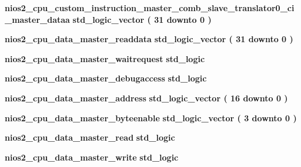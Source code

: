 \begin{DoxyCompactItemize}
\item 
{\bf nios2\+\_\+cpu\+\_\+custom\+\_\+instruction\+\_\+master\+\_\+comb\+\_\+slave\+\_\+translator0\+\_\+ci\+\_\+master\+\_\+dataa} {\bfseries \textcolor{comment}{std\+\_\+logic\+\_\+vector}\textcolor{vhdlchar}{ }\textcolor{vhdlchar}{(}\textcolor{vhdlchar}{ }\textcolor{vhdlchar}{ } \textcolor{vhdldigit}{31} \textcolor{vhdlchar}{ }\textcolor{keywordflow}{downto}\textcolor{vhdlchar}{ }\textcolor{vhdlchar}{ } \textcolor{vhdldigit}{0} \textcolor{vhdlchar}{ }\textcolor{vhdlchar}{)}\textcolor{vhdlchar}{ }} 
\item 
{\bf nios2\+\_\+cpu\+\_\+data\+\_\+master\+\_\+readdata} {\bfseries \textcolor{comment}{std\+\_\+logic\+\_\+vector}\textcolor{vhdlchar}{ }\textcolor{vhdlchar}{(}\textcolor{vhdlchar}{ }\textcolor{vhdlchar}{ } \textcolor{vhdldigit}{31} \textcolor{vhdlchar}{ }\textcolor{keywordflow}{downto}\textcolor{vhdlchar}{ }\textcolor{vhdlchar}{ } \textcolor{vhdldigit}{0} \textcolor{vhdlchar}{ }\textcolor{vhdlchar}{)}\textcolor{vhdlchar}{ }} 
\item 
{\bf nios2\+\_\+cpu\+\_\+data\+\_\+master\+\_\+waitrequest} {\bfseries \textcolor{comment}{std\+\_\+logic}\textcolor{vhdlchar}{ }} 
\item 
{\bf nios2\+\_\+cpu\+\_\+data\+\_\+master\+\_\+debugaccess} {\bfseries \textcolor{comment}{std\+\_\+logic}\textcolor{vhdlchar}{ }} 
\item 
{\bf nios2\+\_\+cpu\+\_\+data\+\_\+master\+\_\+address} {\bfseries \textcolor{comment}{std\+\_\+logic\+\_\+vector}\textcolor{vhdlchar}{ }\textcolor{vhdlchar}{(}\textcolor{vhdlchar}{ }\textcolor{vhdlchar}{ } \textcolor{vhdldigit}{16} \textcolor{vhdlchar}{ }\textcolor{keywordflow}{downto}\textcolor{vhdlchar}{ }\textcolor{vhdlchar}{ } \textcolor{vhdldigit}{0} \textcolor{vhdlchar}{ }\textcolor{vhdlchar}{)}\textcolor{vhdlchar}{ }} 
\item 
{\bf nios2\+\_\+cpu\+\_\+data\+\_\+master\+\_\+byteenable} {\bfseries \textcolor{comment}{std\+\_\+logic\+\_\+vector}\textcolor{vhdlchar}{ }\textcolor{vhdlchar}{(}\textcolor{vhdlchar}{ }\textcolor{vhdlchar}{ } \textcolor{vhdldigit}{3} \textcolor{vhdlchar}{ }\textcolor{keywordflow}{downto}\textcolor{vhdlchar}{ }\textcolor{vhdlchar}{ } \textcolor{vhdldigit}{0} \textcolor{vhdlchar}{ }\textcolor{vhdlchar}{)}\textcolor{vhdlchar}{ }} 
\item 
{\bf nios2\+\_\+cpu\+\_\+data\+\_\+master\+\_\+read} {\bfseries \textcolor{comment}{std\+\_\+logic}\textcolor{vhdlchar}{ }} 
\item 
{\bf nios2\+\_\+cpu\+\_\+data\+\_\+master\+\_\+write} {\bfseries \textcolor{comment}{std\+\_\+logic}\textcolor{vhdlchar}{ }} 

\end{DoxyCompactItemize}
